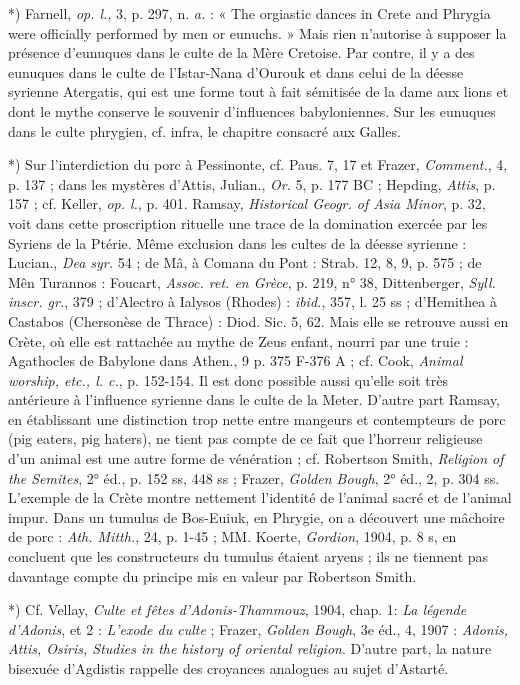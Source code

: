 \documentclass[a4paper, 11pt, oneside, polutonikogreek, french]{article}
\begin{document}
*) Farnell, \emph{op. l.}, 3, p. 297, n. \emph{a.} : « The orgiastic dances in Crete and Phrygia were officially performed by men or eunuchs. » Mais rien n'autorise à supposer la présence d'eunuques dans le culte de la Mère Cretoise. Par contre, il y a des eunuques dans le culte de l'Istar-Nana d'Ourouk et dans celui de la déesse syrienne Atergatis, qui est une forme tout à fait sémitisée de la dame aux lions et dont le mythe conserve le souvenir d'influences babyloniennes. Sur les eunuques dans le culte phrygien, cf. infra, le chapitre consacré aux Galles.

*) Sur l'interdiction du porc à Pessinonte, cf. Paus. 7, 17 et Frazer, \emph{Comment.}, 4, p. 137 ; dans les mystères d'Attis, Julian., \emph{Or.} 5, p. 177 BC ; Hepding, \emph{Attis}, p. 157 ; cf. Keller, \emph{op. l.}, p. 401. Ramsay, \emph{Historical Geogr. of Asia Minor}, p. 32, voit dans cette proscription rituelle une trace de la domination exercée par les Syriens de la Ptérie. Même exclusion dans les cultes de la déesse syrienne : Lucian., \emph{Dea syr.} 54 ; de Mâ, à Comana du Pont : Strab. 12, 8, 9, p. 575 ; de Mên Turannos : Foucart, \emph{Assoc. ret. en Grèce}, p. 219, n° 38, Dittenberger, \emph{Syll. inscr. gr.}, 379 ; d'Alectro à Ialysos (Rhodes) : \emph{ibid.}, 357, l. 25 ss ; d'Hemithea à Castabos (Chersonèse de Thrace) : Diod. Sic. 5, 62. Mais elle se retrouve aussi en Crète, où elle est rattachée au mythe de Zeus enfant, nourri par une truie : Agathocles de Babylone dans Athen., 9 p. 375 F-376 A ; cf. Cook, \emph{Animal worship, etc., l. c.}, p. 152-154. Il est donc possible aussi qu'elle soit très antérieure à l'influence syrienne dans le culte de la Meter. D'autre part Ramsay, en établissant une distinction trop nette entre mangeurs et contempteurs de porc (pig eaters, pig haters), ne tient pas compte de ce fait que l'horreur religieuse d'un animal est une autre forme de vénération ; cf. Robertson Smith, \emph{Religion of the Semites}, 2° éd., p. 152 ss, 448 ss ; Frazer, \emph{Golden Bough}, 2° éd., 2, p. 304 ss. L'exemple de la Crète montre nettement l'identité de l'animal sacré et de l'animal impur. Dans un tumulus de Bos-Euiuk, en Phrygie, on a découvert une mâchoire de porc : \emph{Ath. Mitth.}, 24, p. 1-45 ; MM. Koerte, \emph{Gordion}, 1904, p. 8 s, en concluent que les constructeurs du tumulus étaient aryens ; ils ne tiennent pas davantage compte du principe mis en valeur par Robertson Smith.

*) Cf. Vellay, \emph{Culte et fêtes d'Adonis-Thammouz}, 1904, chap. 1: \emph{La légende d'Adonis}, et 2 : \emph{L'exode du culte} ; Frazer, \emph{Golden Bough}, 3e éd., 4, 1907 : \emph{Adonis, Attis, Osiris, Studies in the history of oriental religion}. D'autre part, la nature bisexuée d'Agdistis rappelle des croyances analogues au sujet d'Astarté.
\end{document}
